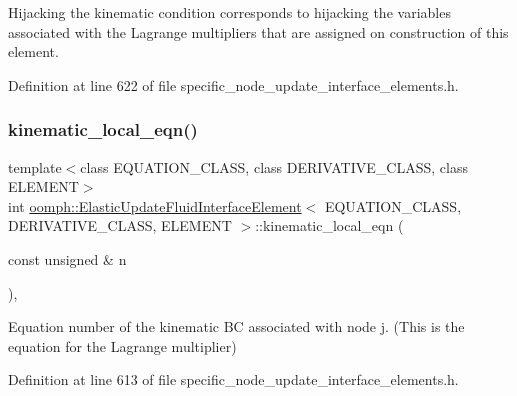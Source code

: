 Hijacking the kinematic condition corresponds to hijacking the variables associated with the Lagrange multipliers that are assigned on construction of this element. 



Definition at line 622 of file specific\+\_\+node\+\_\+update\+\_\+interface\+\_\+elements.\+h.

\mbox{\label{classoomph_1_1ElasticUpdateFluidInterfaceElement_a940840693906b7b8d619ff97f521c811}} 
\subsubsection{\texorpdfstring{kinematic\+\_\+local\+\_\+eqn()}{kinematic\_local\_eqn()}}
{\footnotesize\ttfamily template$<$class E\+Q\+U\+A\+T\+I\+O\+N\+\_\+\+C\+L\+A\+SS, class D\+E\+R\+I\+V\+A\+T\+I\+V\+E\+\_\+\+C\+L\+A\+SS, class E\+L\+E\+M\+E\+NT$>$ \\
int \hyperlink{classoomph_1_1ElasticUpdateFluidInterfaceElement}{oomph\+::\+Elastic\+Update\+Fluid\+Interface\+Element}$<$ E\+Q\+U\+A\+T\+I\+O\+N\+\_\+\+C\+L\+A\+SS, D\+E\+R\+I\+V\+A\+T\+I\+V\+E\+\_\+\+C\+L\+A\+SS, E\+L\+E\+M\+E\+NT $>$\+::kinematic\+\_\+local\+\_\+eqn (\begin{DoxyParamCaption}\item[{const unsigned \&}]{n }\end{DoxyParamCaption})\hspace{0.3cm}{\ttfamily [inline]}, {\ttfamily [private]}}



Equation number of the kinematic BC associated with node j. (This is the equation for the Lagrange multiplier) 



Definition at line 613 of file specific\+\_\+node\+\_\+update\+\_\+interface\+\_\+elements.\+h.

\mbox{\label{classoomph_1_1ElasticUpdateFluidInterfaceElement_a8b5c5b703e6daafbe1dcafd3fe93e537}} 

